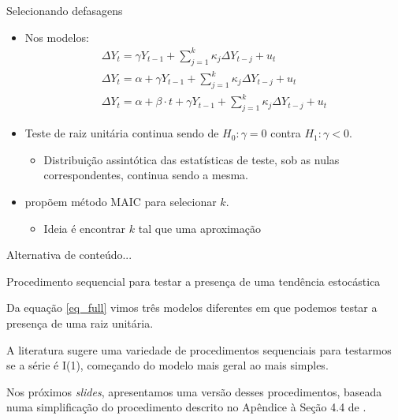 \documentclass[11pt]{beamer}
\newenvironment{wideitemize}{\itemize\addtolength{\itemsep}{10pt}}{\enditemize}
\begin{document}
\begin{frame}{Selecionando defasagens}
		\begin{itemize}
			\item Nos modelos:
			\begin{equation*}
		\begin{aligned}
			\Delta Y_t = \gamma Y_{t-1}  +\sum_{j=1}^k \kappa_j \Delta Y_{t-j} + u_t \\
			\Delta Y_t = \alpha + \gamma Y_{t-1}  +\sum_{j=1}^k \kappa_j \Delta Y_{t-j} + u_t
			\\
			\Delta Y_t = \alpha + \beta \cdot t + \gamma Y_{t-1} +  \sum_{j=1}^k\kappa_j \Delta Y_{t-j} + u_t
		\end{aligned}
	\end{equation*}

			\item Teste de raiz unitária continua sendo de $H_0: \gamma = 0$ contra $H_1: \gamma < 0$.
			\begin{itemize}
				\item Distribuição assintótica das estatísticas de teste, sob as nulas correspondentes, continua sendo a mesma.
			\end{itemize}
		\item \citet{Ng2001} propõem método MAIC para selecionar $k$.
		\begin{itemize}
			\item Ideia é encontrar $k$ tal que uma aproximação 
		\end{itemize}
	\end{itemize}
\end{frame}
\begin{frame}{Alternativa de \citet{Phillips1988}}
	conteúdo...
\end{frame}
\begin{frame}{Procedimento sequencial para testar a presença de uma tendência estocástica}
	\begin{wideitemize}
		\item Da equação \eqref{eq_full} vimos três modelos diferentes em que podemos testar a presença de uma raiz unitária.
		\item A literatura sugere uma variedade de procedimentos {\color{blue}sequenciais} para testarmos se a série é I(1), começando do modelo mais geral ao mais simples.
		\item Nos próximos \textit{slides}, apresentamos uma versão desses procedimentos, baseada numa simplificação do procedimento descrito no Apêndice à Seção 4.4 de \citet{Enders2014}.
		
	\end{wideitemize}
\end{frame}
\end{document}
